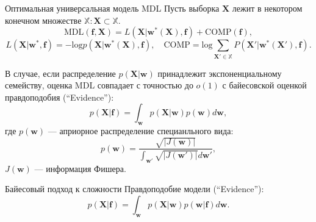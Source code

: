 \documentclass[10pt,pdf,utf8,russian,aspectratio=169]{beamer}
\begin{document}
\begin{frame}{Оптимальная универсальная модель MDL}
Пусть выборка $\mathbf{X}$ лежит в некотором конечном множестве $\mathbb{X}: \mathbf{X} \subset \mathbb{X}$.
\[
\text{MDL}(\mathbf{f}, \mathbf{X}) = L(\mathbf{X}|\mathbf{w}^*(\mathbf{X}), \mathbf{f}) + \text{COMP}(\mathbf{f}),
\]
$$ L(\mathbf{X}|\mathbf{w}^*, \mathbf{f}) = -\text{log}p(\mathbf{X}|\mathbf{w}^*(\mathbf{X}), \mathbf{f}), \quad 
\text{COMP} = \text{log} \sum_{\mathbf{X}' \in \mathbb{X}} P(\mathbf{X}'|\mathbf{w}^*(\mathbf{X}'), \mathbf{f}).$$

В случае, если распределение $p(\mathbf{X}|\mathbf{w})$ принадлежит экспоненциальному семейству, оценка MDL совпадает с точностью до $o(1)$ с байесовской оценкой правдоподобия (``Evidence''):
\[
	p(\mathbf{X}|\mathbf{f}) = \int_\mathbf{w} p(\mathbf{X}|\mathbf{w})p(\mathbf{w}) d\mathbf{w},
\]
где $p(\mathbf{w})$ --- априорное распределение специанльного вида:
$$
	p(\mathbf{w}) = \frac{\sqrt{|J(\mathbf{w})|}}{\int_{\mathbf{w}'} \sqrt{|J(\mathbf{w'})|}d\mathbf{w'}},
$$
$J(\mathbf{w})$  --- информация Фишера.
\end{frame}	


\begin{frame}{Байесовый подход к сложности}
Правдоподобие модели (``Evidence''):
\[
	p(\mathbf{X}|\mathbf{f}) = \int_\mathbf{w} p(\mathbf{X}|\mathbf{w})p(\mathbf{w}|\mathbf{f}) d\mathbf{w}.
\]


\begin{figure}
  \centering
\label{fig:1}\qquad

\end{figure}


\end{frame}
\end{document}
